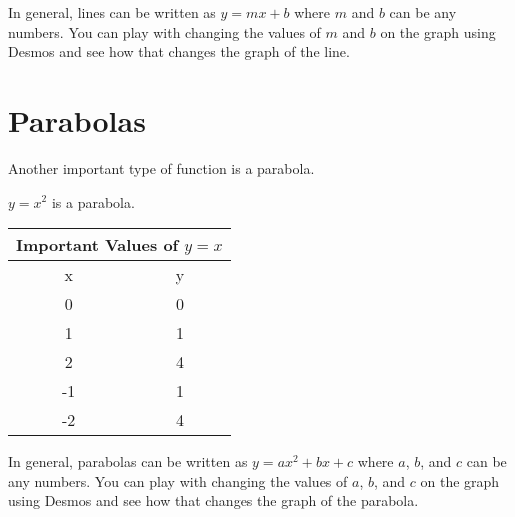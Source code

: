 \documentclass{ximera}
\begin{document}
In general, lines can be written as $y=mx+b$ where $m$ and $b$ can be any numbers.  You can play with changing the values of $m$ and $b$ on the graph using Desmos and see how that changes the graph of the line.  

\begin{center}  
\end{center}



\section{Parabolas}
Another important type of function is a parabola.  

\begin{example}
$y=x^2$ is a parabola.


\begin{tabular}{ |c || c|  }
 \hline
 \multicolumn{2}{|c|}{Important Values of $y=x$} \\
\hline
 \hline
 x & y\\
 \hline
 0&0\\
 1&1\\
 2&4\\
 -1&1\\
 -2&4\\
 \hline
\end{tabular}

\end{example}

In general, parabolas can be written as $y=ax^2+bx+c$ where $a$, $b$, and $c$ can be any numbers.  You can play with changing the values of $a$, $b$, and $c$ on the graph using Desmos and see how that changes the graph of the parabola.  

\begin{center}  
\end{center}



\end{document}
